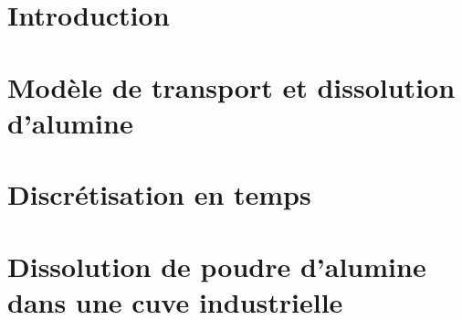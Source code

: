 \section{Introduction}
\label{sec:populations-introduction}


\section{Modèle de transport et dissolution d'alumine}
\label{sec:populations-model}


\section{Discrétisation en temps}
\label{sec:populations-discretisation}


\section{Dissolution de poudre d'alumine dans une cuve industrielle}
\label{sec:populations-industriel}


